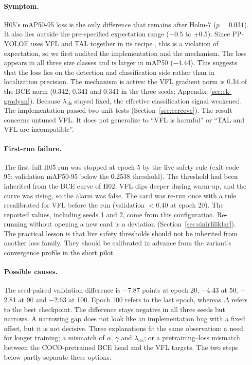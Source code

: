 \documentclass[pdflatex,iicol,sn-mathphys-num]{sn-jnl}
\begin{document}
\paragraph{Symptom.}
H05's mAP50-95 loss is the only difference that remains after Holm-7 ($p=0.031$). It also lies outside the pre-specified expectation range ($-$0.5 to +0.5). Since PP-YOLOE uses VFL and TAL together in its recipe \cite{xu_2022_ppyoloe}, this is a violation of expectation, so we first audited the implementation and the mechanism. The loss appears in all three size classes and is larger in mAP50 ($-$4.44). This suggests that the loss lies on the detection and classification side rather than in localization precision. The mechanism is active: the VFL gradient norm is 0.34 of the BCE norm (0.342, 0.341 and 0.341 in the three seeds; Appendix~\ref{sec:ek-gradyan}). Because $\lambda_{\mathrm{cls}}$ stayed fixed, the effective classification signal weakened. The implementation passed two unit tests (Section~\ref{sec:cerceve}). The result concerns untuned VFL. It does not generalize to ``VFL is harmful'' or ``TAL and VFL are incompatible''.

\paragraph{First-run failure.}
The first full H05 run was stopped at epoch 5 by the live safety rule (exit code 95; validation mAP50-95 below the 0.2538 threshold). The threshold had been inherited from the BCE curve of H02. VFL dips deeper during warm-up, and the curve was rising, so the alarm was false. The card was re-run once with a rule recalibrated for VFL before the run (validation $<0.40$ at epoch 20). The reported values, including seeds 1 and 2, come from this configuration. Re-running without opening a new card is a deviation (Section~\ref{sec:sinirliliklar}). The practical lesson is that live safety thresholds should not be inherited from another loss family. They should be calibrated in advance from the variant's convergence profile in the short pilot.

\paragraph{Possible causes.}
The seed-paired validation difference is $-$7.87 points at epoch 20, $-$4.43 at 50, $-$2.81 at 90 and $-$2.63 at 100. Epoch 100 refers to the last epoch, whereas $\Delta$ refers to the best checkpoint. The difference stays negative in all three seeds but narrows. A narrowing gap does not look like an implementation bug with a fixed offset, but it is not decisive. Three explanations fit the same observation: a need for longer training; a mismatch of $\alpha$, $\gamma$ and $\lambda_{\mathrm{cls}}$; or a pretraining--loss mismatch between the COCO-pretrained BCE head and the VFL targets. The two steps below partly separate these options.
\end{document}
